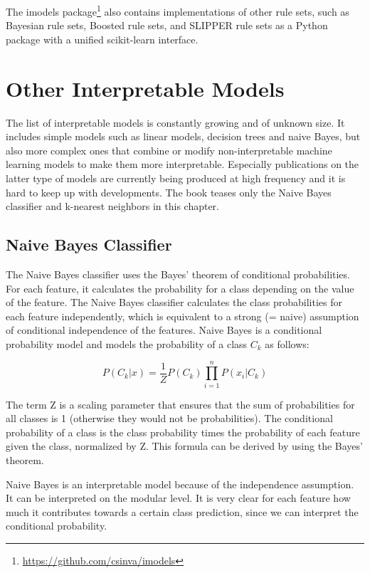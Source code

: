 \documentclass[
  12pt,
]{krantz}
\renewcommand{\href}[2]{#2\footnote{\url{#1}}}
\begin{document}
The \href{https://github.com/csinva/imodels}{imodels package} also contains implementations of other rule sets, such as Bayesian rule sets, Boosted rule sets, and SLIPPER rule sets as a Python package with a unified scikit-learn interface.

\newpage

\hypertarget{other-interpretable}{%
\section{Other Interpretable Models}\label{other-interpretable}}

The list of interpretable models is constantly growing and of unknown size.
It includes simple models such as linear models, decision trees and naive Bayes, but also more complex ones that combine or modify non-interpretable machine learning models to make them more interpretable.
Especially publications on the latter type of models are currently being produced at high frequency and it is hard to keep up with developments.
The book teases only the Naive Bayes classifier and k-nearest neighbors in this chapter.

\hypertarget{naive-bayes-classifier}{%
\subsection{Naive Bayes Classifier}\label{naive-bayes-classifier}}

The Naive Bayes classifier uses the Bayes' theorem of conditional probabilities.
For each feature, it calculates the probability for a class depending on the value of the feature.
The Naive Bayes classifier calculates the class probabilities for each feature independently, which is equivalent to a strong (= naive) assumption of conditional independence of the features.
Naive Bayes is a conditional probability model and models the probability of a class \(C_k\) as follows:

\[P(C_k|x)=\frac{1}{Z}P(C_k)\prod_{i=1}^n{}P(x_i|C_k)\]

The term Z is a scaling parameter that ensures that the sum of probabilities for all classes is 1 (otherwise they would not be probabilities).
The conditional probability of a class is the class probability times the probability of each feature given the class, normalized by Z.
This formula can be derived by using the Bayes' theorem.

Naive Bayes is an interpretable model because of the independence assumption.
It can be interpreted on the modular level.
It is very clear for each feature how much it contributes towards a certain class prediction, since we can interpret the conditional probability.
\end{document}

